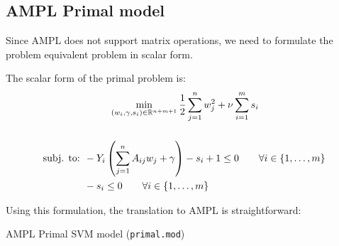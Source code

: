 \pagebreak
\subsection{AMPL Primal model}

Since AMPL does not support matrix operations,
we need to formulate the problem equivalent
problem in scalar form.

The scalar form of the primal problem is:
\begin{align*}
    \span\min_{
        (w_i,\gamma,s_i) \in \mathbb{R}^{n+m+1}
    }
    \frac{1}{2} \sum_{j=1}^n w_j^2 + \nu \sum_{i=1}^m s_i
    \\[1.5em]
    \text{subj. to: } & -Y_i \left( \sum_{j=1}^n A_{ij} w_j + \gamma \right) - s_i + 1 \leq 0 \qquad \forall i \in \{1,\ldots,m\} \\
                      & -s_i \leq 0 \qquad \forall i \in \{1,\ldots,m\}
\end{align*}


Using this formulation, the translation to AMPL is straightforward:
\begin{listing}[H]
    \caption{AMPL Primal SVM model (\texttt{primal.mod})}
    \inputminted{ampl}{../ampl/primal.mod}
\end{listing}

